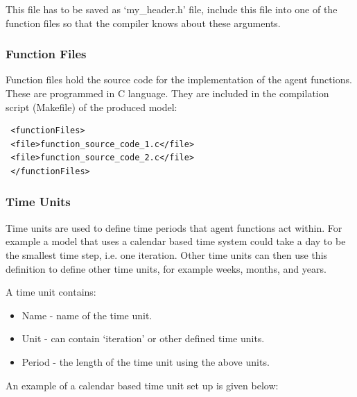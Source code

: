 \documentclass[a4paper,11pt]{article}
\newenvironment{mylisting}
{\begin{list}{}{\setlength{\leftmargin}{1em}}\item\small\bfseries}
{\end{list}}
\begin{document}
 This file has to be saved as `my\_header.h' file, include this file into one of
 the function files so that the compiler knows about these arguments.

\subsubsection{Function Files}

Function files hold the source code for the implementation of the
agent functions. These are programmed in C language. They are
included in the compilation script (Makefile) of the produced model:

\begin{mylisting}
\begin{verbatim}
 <functionFiles>
 <file>function_source_code_1.c</file>
 <file>function_source_code_2.c</file>
 </functionFiles>
\end{verbatim}
\end{mylisting}

\subsubsection{Time Units}
\label{timeunit}


Time units are used to define time periods that agent functions act
within. For example a model that uses a calendar based time system
could take a day to be the smallest time step, i.e. one iteration.
Other time units can then use this definition to define other time
units, for example weeks, months, and years.

A time unit contains:

\begin{itemize}
\item Name - name of the time unit.
\item Unit - can contain `iteration' or other defined time units.
\item Period - the length of the time unit using the above units.
\end{itemize}

An example of a calendar based time unit set up is given below:
\end{document}
